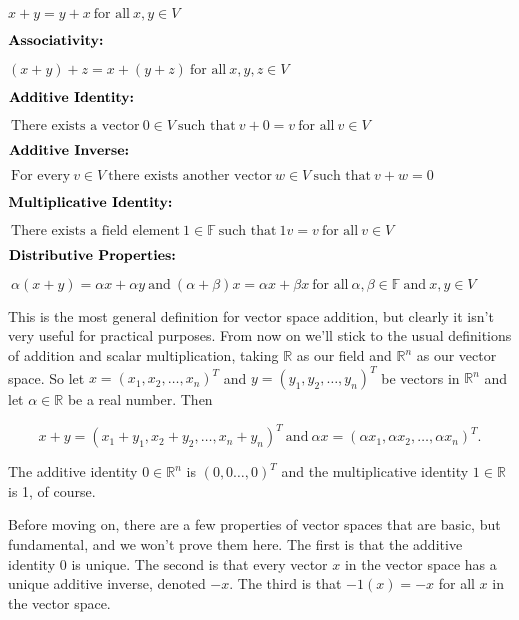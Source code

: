 \documentclass[12pt]{article}
\begin{document}
$ x + y = y + x \: \textrm{for all} \: x, y \in V$

\vskip 2mm

$\textbf{\textrm{Associativity:}}$ 

$ (x + y) + z = x + (y + z) \: \textrm{for all} \: x, y, z \in V$

\vskip 2mm

$\textbf{\textrm{Additive Identity:}} $

$\: \textrm{There exists a vector} \: 0 \in V \: \textrm{such that} \: v + 0 = v \: \textrm{for all} \: v \in V$

\vskip 2mm

$\textbf{\textrm{Additive Inverse:}} $

$\: \textrm{For every} \: v \in V \: \textrm{there exists another vector} \: w \in V \: \textrm{such that} \: v + w = 0$

\vskip 2mm

$\textbf{\textrm{Multiplicative Identity:}} $

$\: \textrm{There exists a field element} \: 1 \in \mathbb{F} \: \textrm{such that} \: 1v = v \: \textrm{for all} \: v \in V$

\vskip 2mm

$\textbf{\textrm{Distributive Properties:}} $

$\: \alpha(x + y) = \alpha x + \alpha y \: \textrm{and} \: (\alpha + \beta)x = \alpha x + \beta x \: \textrm{for all} \: \alpha, \beta \in \mathbb{F} \: \textrm{and} \: x, y \in V$


\vskip 5mm
This is the most general definition for vector space addition, but clearly it isn't very useful for practical purposes. From now on we'll stick to the usual definitions of addition and scalar multiplication, taking $\mathbb{R}$ as our field and $\mathbb{R}^n$ as our vector space. So let $x = (x_1, x_2, \ldots, x_n)^T$ and $y = (y_1, y_2, \ldots, y_n)^T$ be vectors in $\mathbb{R}^n$ and let $\alpha \in \mathbb{R}$ be a real number. Then

$$x + y = (x_1 + y_1, x_2 + y_2, \ldots, x_n + y_n)^T \: \textrm{and} \: \alpha x = (\alpha x_1, \alpha x_2, \ldots, \alpha x_n)^T.$$

The additive identity $0 \in \mathbb{R}^n$ is $(0, 0 \ldots, 0)^T$ and the multiplicative identity $1 \in \mathbb{R}$ is 1, of course. 

Before moving on, there are a few properties of vector spaces that are basic, but fundamental, and we won't prove them here. The first is that the additive identity $0$ is unique. The second is that every vector $x$ in the vector space has a unique additive inverse, denoted $-x$. The third is that $-1(x) = -x$ for all $x$ in the vector space.
\end{document}
